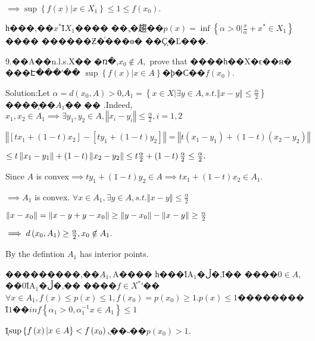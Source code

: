 \documentclass{article}
\begin{document}
\begin{CJK}{GBK}{song}
$\implies \sup \left\{ f\left( x\right) |x\in X_{1}\right\} \leq 1\leq
f\left( x_{0}\right) .$

һ���,��$x^{\ast }$Ϊ$X_{1}$����%
��,ֻ�趨��$p\left( x\right) =\inf \left\{
\alpha >0|\frac{x}{\alpha }+x^{\ast }\in X_{1}\right\} $����%
������Ƶ�ͬ���ɵ�%
��Ҫ֤�Ľ���.

9.��A��n.l.s.X��͹�ռ�,$x_{0}\notin A,$%
prove that ����һ��X�ϵ��н�%
���Է���ʹ�� $\sup \left\{ f\left(
x\right) |x\in A\right\} $�ϸ�С��$f\left(
x_{0}\right) $.

Solution:Let $\alpha =d\left( x_{0},A\right) >0$,$A_{1}=\left\{ x\in
X|\exists y\in A,s.t.\left\Vert x-y\right\Vert \leq \frac{\alpha }{2}%
\right\} $����֤��$A_{1}$��͹��%
.Indeed, $x_{1},x_{2}\in A_{1}\implies \exists y_{1},y_{2}\in A,\left\Vert
x_{i}-y_{i}\right\Vert \leq \frac{\alpha }{2},i=1,2$

$\left\Vert \left[ tx_{1}+\left( 1-t\right) x_{2}\right] -\left[
ty_{1}+\left( 1-t\right) y_{2}\right] \right\Vert =\left\Vert t\left(
x_{1}-y_{1}\right) +\left( 1-t\right) \left( x_{2}-y_{2}\right) \right\Vert $

$\leq t\left\Vert x_{1}-y_{1}\right\Vert +\left( 1-t\right) \left\Vert
x_{2}-y_{2}\right\Vert \leq t\frac{\alpha }{2}+\left( 1-t\right) \frac{%
\alpha }{2}\leq \frac{\alpha }{2}.$

Since $A$ is convex$\implies ty_{1}+\left( 1-t\right) y_{2}\in A\implies
tx_{1}+\left( 1-t\right) x_{2}\in A_{1}.$

$\implies A_{1}$ is convex. $\forall x\in A_{1},\exists y\in
A,s.t.\left\Vert x-y\right\Vert \leq \frac{\alpha }{2}$

$\left\Vert x-x_{0}\right\Vert =\left\Vert x-y+y-x_{0}\right\Vert \geq
\left\Vert y-x_{0}\right\Vert -\left\Vert x-y\right\Vert \geq \frac{\alpha }{%
2}$

$\bigskip \implies d\left( x_{0},A_{1}\right) \geq \frac{\alpha }{2}%
,x_{0}\notin A_{1}.$

By the defintion $A_{1}$ has interior points.

���������,��$A_{1},$A����%
һ���ΪA$_{1}$�ڵ�,Ϊ��%
����0$\in A,$��0ΪA$_{1}$�ڵ�,��%
����$f\in X^{\ast }$ʹ��$\forall x\in A_{1},f\left(
x\right) \leq p\left( x\right) \leq 1,f\left( x_{0}\right) =p\left(
x_{0}\right) \geq 1.p\left( x\right) \leq 1$��������%
Ϊ$1$��$inf\left\{ \alpha _{1}>0,\alpha _{1}^{-1}x\in
A_{1}\right\} \leq 1$

Ϊ֤$\bigskip \sup \left\{ f\left( x\right) |x\in A\right\}
<f\left( x_{0}\right) ,$ֻ��˵��$p\left(
x_{0}\right) >1.$


\end{CJK}
\end{document}
